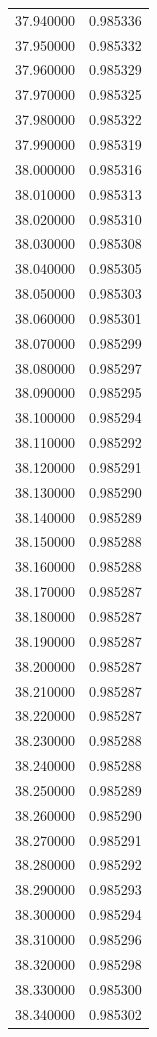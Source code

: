 \begin{tabular}{rr}
37.940000 & 0.985336 \\
37.950000 & 0.985332 \\
37.960000 & 0.985329 \\
37.970000 & 0.985325 \\
37.980000 & 0.985322 \\
37.990000 & 0.985319 \\
38.000000 & 0.985316 \\
38.010000 & 0.985313 \\
38.020000 & 0.985310 \\
38.030000 & 0.985308 \\
38.040000 & 0.985305 \\
38.050000 & 0.985303 \\
38.060000 & 0.985301 \\
38.070000 & 0.985299 \\
38.080000 & 0.985297 \\
38.090000 & 0.985295 \\
38.100000 & 0.985294 \\
38.110000 & 0.985292 \\
38.120000 & 0.985291 \\
38.130000 & 0.985290 \\
38.140000 & 0.985289 \\
38.150000 & 0.985288 \\
38.160000 & 0.985288 \\
38.170000 & 0.985287 \\
38.180000 & 0.985287 \\
38.190000 & 0.985287 \\
38.200000 & 0.985287 \\
38.210000 & 0.985287 \\
38.220000 & 0.985287 \\
38.230000 & 0.985288 \\
38.240000 & 0.985288 \\
38.250000 & 0.985289 \\
38.260000 & 0.985290 \\
38.270000 & 0.985291 \\
38.280000 & 0.985292 \\
38.290000 & 0.985293 \\
38.300000 & 0.985294 \\
38.310000 & 0.985296 \\
38.320000 & 0.985298 \\
38.330000 & 0.985300 \\
38.340000 & 0.985302 \\

\end{tabular}
